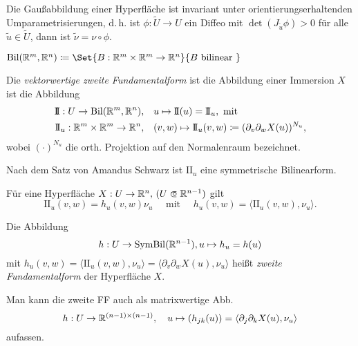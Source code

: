\documentclass{cheat-sheet}
\newcommand{\Bil}{\mathrm{Bil}}
\newcommand{\SymBil}{\mathrm{SymBil}}
\newcommand{\II}{\mathrm{I\!I}}
\begin{document}
\begin{satz}
  Die Gaußabbildung einer Hyperfläche ist invariant unter orientierungserhaltenden Umparametrisierungen, d.\,h. ist $\phi : \tilde{U} \to U$ ein Diffeo mit $\det(J_{\tilde{u}} \phi) > 0$ für alle $\tilde{u} \in \tilde{U}$, dann ist $\tilde{\nu} = \nu \circ \phi$.
\end{satz}

\begin{nota}
  $\Bil(\R^m, \R^n) \coloneqq \Set{ B : \R^m \times \R^m \to \R^n }{ B \text{ bilinear } }$
\end{nota}

\begin{definition}
  Die \emph{vektorwertige zweite Fundamentalform} ist die Abbildung einer Immersion $X$ ist die Abbildung
  \begin{align*}
    \II : U \to \Bil(\R^m, \R^n), \quad & u \mapsto \II(u) = \II_u, \text { mit } \\
    \II_u : \R^m \times \R^m \to \R^n, \quad & (v, w) \mapsto \II_u(v, w) \coloneqq (\partial_v \partial_w X(u))^{N_u},
  \end{align*}
  wobei $(\cdot)^{N_u}$ die orth. Projektion auf den Normalenraum bezeichnet.
\end{definition}

\begin{bem}
  Nach dem Satz von Amandus Schwarz ist $\II_u$ eine symmetrische Bilinearform.
\end{bem}

\begin{bem}
  Für eine Hyperfläche $X : U \to \R^n, \, (U \opn \R^{n-1})$ gilt
  \[ \II_u(v, w) = h_u(v, w) \nu_u \quad \text{ mit } \quad h_u(v, w) = \langle \II_u(v, w) , \nu_u \rangle. \]
\end{bem}

\begin{definition}
  Die Abbildung
  \[ h : U \to \SymBil(\R^{n-1}), u \mapsto h_u = h(u) \]
  mit $h_u(v, w) = \langle \II_u(v, w), \nu_u \rangle = \langle \partial_v \partial_w X(u), \nu_u \rangle$ heißt \emph{zweite Fundamentalform} der Hyperfläche $X$.
\end{definition}

\begin{bem}
  Man kann die zweite FF auch als matrixwertige Abb.
  \[ h : U \to \mathbb{R}^{(n-1) \times (n-1)}, \quad u \mapsto (h_{jk}(u)) = \langle \partial_j \partial_k X(u), \nu_u \rangle \]
  aufassen.
\end{bem}
\end{document}
